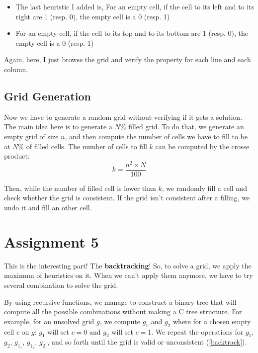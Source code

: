 \documentclass[a4paper,12pt]{article}
\begin{document}
\begin{itemize}
    \item The last heuristic I added is, For an empty cell, if the cell to its left and to its right are 1 (resp. 0), the empty cell is a 0 (resp. 1)
    \item For an empty cell, if the cell to its top and to its bottom are 1 (resp. 0), the empty cell is a 0 (resp. 1)
\end{itemize}

Again, here, I just browse the grid and verify the property for each line and each column.

\subsection{Grid Generation}

Now we have to generate a random grid without verifying if it gets a solution. The main idea here is to generate a $N\%$ filled grid. 
To do that, we generate an empty grid of size $n$, 
and then compute the number of cells we have to fill to be at $N\%$ of filled cells. 
The number of cells to fill $k$ can be computed by the crosse product:
\begin{equation}
    k = \frac{n^2\times N}{100}
\end{equation}

Then, while the number of filled cell is lower than $k$, we randomly fill a cell and check whether the grid is consistent. If the grid isn't consistent after a filling, we undo it and fill an other cell.

\section{Assignment 5}

This is the interesting part! The \textbf{backtracking}! So, to solve a grid, we apply the maximum of heuristics on it. When we can't apply them anymore, we have to try several combination to solve the grid.

By using recursive functions, we manage to construct a binary tree that will compute all the possible combinations without making a C tree structure.
For example, for an unsolved grid $g$, we compute $g_1$ and $g_2$ where for a chosen empty cell $c$ on $g$: $g_1$ will set $c = 0$ and $g_2$ will set $c=1$. We repeat the operations for $g_1$, $g_2$, $g_{1_1}$, $g_{1_2}$, $g_{2_1}$, and so forth until the grid is valid or unconsistent (\ref{backtrack}).
\end{document}
